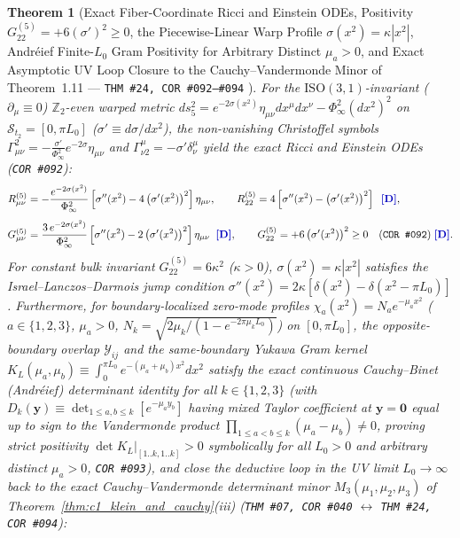 \documentclass[11pt,a4paper]{article}
\newcommand{\catD}{\text{\textbf{\textcolor{blue!75!black}{[D]}}}}
\theoremstyle{definition}
\theoremstyle{plain}
\newtheorem{theorem}[axiom]{Theorem}
\theoremstyle{remark}
\begin{document}
\begin{theorem}[{Exact Fiber-Coordinate Ricci and Einstein ODEs, Positivity $G_{22}^{(5)} = +6(\sigma')^2 \ge 0$, the Piecewise-Linear Warp Profile $\sigma(x^2) = \kappa|x^2|$, Andr\'eief Finite-$L_0$ Gram Positivity for Arbitrary Distinct $\mu_a > 0$, and Exact Asymptotic UV Loop Closure to the Cauchy--Vandermonde Minor of Theorem~1.11 --- \texttt{THM~\#24, COR~\#092--\#094} \catD}]\label{thm:c5_iso31_fiber_closure}\label{thm:c5_iso31_orbifold_localization}
For the $\mathrm{ISO}(3,1)$-invariant ($\partial_\mu \equiv 0$) $\mathbb{Z}_2$-even warped metric $ds_5^2 = e^{-2\sigma(x^2)}\eta_{\mu\nu}dx^\mu dx^\nu - \Phi_\infty^2(dx^2)^2$ on $\mathcal{S}_{t_2} = [0, \pi L_0]$ ($\sigma' \equiv d\sigma/dx^2$), the non-vanishing Christoffel symbols $\Gamma^2_{\mu\nu} = -\frac{\sigma'}{\Phi_\infty^2}e^{-2\sigma}\eta_{\mu\nu}$ and $\Gamma^\mu_{\nu 2} = -\sigma'\delta^\mu_\nu$ yield the exact Ricci and Einstein ODEs (\texttt{COR~\#092}):
\begin{align}
R_{\mu\nu}^{(5)} &= -\frac{e^{-2\sigma(x^2)}}{\Phi_\infty^2}\left[\sigma''(x^2) - 4\left(\sigma'(x^2)\right)^2\right]\eta_{\mu\nu}, \qquad
R_{22}^{(5)} = 4\left[\sigma''(x^2) - \left(\sigma'(x^2)\right)^2\right] \;\;\catD, \label{eq:c5_iso31_ricci} \\[4pt]
G_{\mu\nu}^{(5)} &= \frac{3\,e^{-2\sigma(x^2)}}{\Phi_\infty^2}\left[\sigma''(x^2) - 2\left(\sigma'(x^2)\right)^2\right]\eta_{\mu\nu} \;\;\catD, \qquad
G_{22}^{(5)} = +6\left(\sigma'(x^2)\right)^2 \ge 0 \quad \textnormal{(\texttt{COR~\#092})} \;\catD. \label{eq:c5_iso31_einstein}
\end{align}
For constant bulk invariant $G_{22}^{(5)} = 6\kappa^2$ ($\kappa > 0$), $\sigma(x^2) = \kappa|x^2|$ satisfies the Israel--Lanczos--Darmois jump condition $\sigma''(x^2) = 2\kappa[\delta(x^2) - \delta(x^2 - \pi L_0)]$. Furthermore, for boundary-localized zero-mode profiles $\chi_a(x^2) = N_a e^{-\mu_a x^2}$ ($a \in \{1, 2, 3\}$, $\mu_a > 0$, $N_k = \sqrt{2\mu_k/(1 - e^{-2\pi\mu_k L_0})}$) on $[0, \pi L_0]$, the opposite-boundary overlap $\mathcal{Y}_{ij}$ and the same-boundary Yukawa Gram kernel $K_L(\mu_a, \mu_b) \equiv \int_0^{\pi L_0} e^{-(\mu_a+\mu_b)x^2}dx^2$ satisfy the exact continuous Cauchy--Binet (Andr\'eief) determinant identity for all $k \in \{1, 2, 3\}$ (with $D_k(\mathbf{y}) \equiv \det_{1\le a,b\le k}[e^{-\mu_a y_b}]$ having mixed Taylor coefficient at $\mathbf{y} = \mathbf{0}$ equal up to sign to the Vandermonde product $\prod_{1\le a<b\le k}(\mu_a - \mu_b) \neq 0$, proving strict positivity $\det K_L|_{[1..k,1..k]} > 0$ symbolically for all $L_0 > 0$ and arbitrary distinct $\mu_a > 0$, \texttt{COR~\#093}), and close the deductive loop in the UV limit $L_0 \to \infty$ back to the exact Cauchy--Vandermonde determinant minor $M_3(\mu_1, \mu_2, \mu_3)$ of Theorem~\ref{thm:c1_klein_and_cauchy}(iii) (\texttt{THM~\#07, COR~\#040} $\longleftrightarrow$ \texttt{THM~\#24, COR~\#094}):

\end{theorem}
\end{document}
